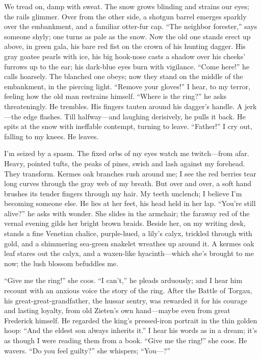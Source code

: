 \documentclass[12pt,a4paper]{article}
\begin{document}
We tread on, damp with sweat. The snow grows blinding and strains our eyes; the rails glimmer. Over from the other side, a shotgun barrel emerges sparkly over the embankment, and a familiar otter-fur cap. “The neighbor forester,” says someone shyly; one turns as pale as the snow. Now the old one stands erect up above, in green gala, his bare red fist on the crown of his hunting dagger. His gray goatee pearls with ice, his big hook-nose casts a shadow over his cheeks’ furrows up to the ear; his dark-blue eyes burn with vigilance. “Come here!” he calls hoarsely. The blanched one obeys; now they stand on the middle of the embankment, in the piercing light. “Remove your gloves!” I hear, to my terror, feeling how the old man restrains himself. “Where is the ring?” he asks threateningly. He trembles. His fingers tauten around his dagger’s handle. A jerk—the edge flashes. Till halfway—and laughing derisively, he pulls it back. He spits at the snow with ineffable contempt, turning to leave. “Father!” I cry out, falling to my knees. He leaves.

I’m seized by a spasm. The fixed orbs of my eyes watch me twitch—from afar. Heavy, pointed tufts, the peaks of pines, swish and lash against my forehead. They transform. Kermes oak branches rush around me; I see the red berries tear long curves through the gray web of my breath. But over and over, a soft hand brushes its tender fingers through my hair. My teeth unclench; I believe I’m becoming someone else. He lies at her feet, his head held in her lap. “You’re still alive?” he asks with wonder. She slides in the armchair; the faraway red of the vernal evening gilds her bright brown braids. Beside her, on my writing desk, stands a fine Venetian chalice, purple-hued, a lily’s calyx, trickled through with gold, and a shimmering sea-green snakelet wreathes up around it. A kermes oak leaf stares out the calyx, and a waxen-like hyacinth—which she’s brought to me now; the lush blossom befuddles me.

“Give me the ring!” she coos. “I can’t,” he pleads arduously; and I hear him recount with an anxious voice the story of the ring. After the Battle of Torgau, his great-great-grandfather, the hussar sentry, was rewarded it for his courage and lasting loyalty, from old Zieten’s own hand—maybe even from great Frederick himself. He regarded the king’s pressed-iron portrait in the thin golden hoop: “And the eldest son always inherits it.” I hear his words as in a dream; it’s as though I were reading them from a book. “Give me the ring!” she coos. He wavers. “Do you feel guilty?” she whispers; “You—?”
\end{document}
